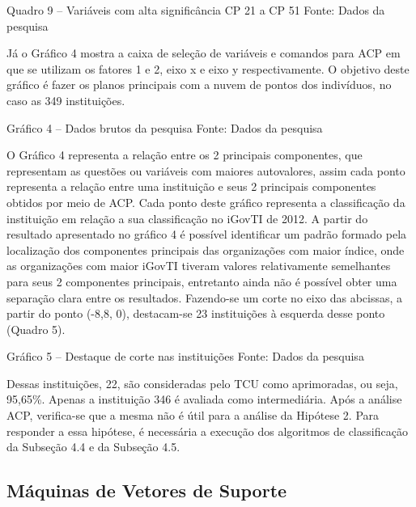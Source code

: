 Quadro 9 – Variáveis com alta significância CP 21 a CP 51
Fonte: Dados da pesquisa

Já o Gráfico 4 mostra a caixa de seleção de variáveis e comandos para ACP em que se utilizam os fatores 1 e 2, eixo x e eixo y respectivamente. O objetivo deste gráfico é fazer os planos principais com a nuvem de pontos dos indivíduos, no caso as 349 instituições.  


Gráfico 4 – Dados brutos da pesquisa
Fonte: Dados da pesquisa

O Gráfico 4 representa a relação entre os 2 principais componentes, que representam as questões ou variáveis com maiores autovalores, assim cada ponto representa a relação entre uma instituição e seus 2 principais componentes obtidos por meio de ACP. Cada ponto deste gráfico representa a classificação da instituição em relação a sua classificação no iGovTI de 2012. A partir do resultado apresentado no gráfico 4 é possível identificar um padrão formado pela localização dos componentes principais das organizações com maior índice, onde as organizações com maior iGovTI tiveram valores relativamente semelhantes para seus 2 componentes principais, entretanto ainda não é possível obter uma separação clara entre os resultados. Fazendo-se um corte no eixo das abcissas, a partir do ponto (-8,8, 0), destacam-se 23 instituições à esquerda desse ponto (Quadro 5). 

Gráfico 5 – Destaque de corte nas instituições 
Fonte: Dados da pesquisa

Dessas instituições, 22, são consideradas pelo TCU como aprimoradas, ou seja, 95,65\%. Apenas a instituição 346 é avaliada como intermediária.
Após a análise ACP, verifica-se que a mesma não é útil para a análise da Hipótese 2. Para responder a essa hipótese, é necessária a execução dos algoritmos de classificação da Subseção 4.4 e da Subseção 4.5.

\subsection{Máquinas de Vetores de Suporte}

